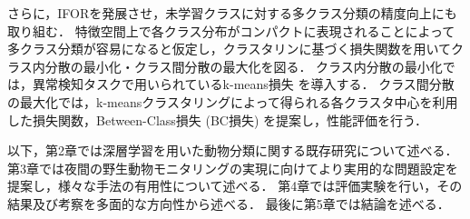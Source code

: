 \documentclass[a4paper,11pt,nomag]{jsreport}
\begin{document}
さらに，IFORを発展させ，未学習クラスに対する多クラス分類の精度向上にも取り組む．
特徴空間上で各クラス分布がコンパクトに表現されることによって多クラス分類が容易になると仮定し，クラスタリンに基づく損失関数を用いてクラス内分散の最小化・クラス間分散の最大化を図る．
クラス内分散の最小化では，異常検知タスクで用いられているk-means損失 \cite{k-means} を導入する．
クラス間分散の最大化では，k-meansクラスタリングによって得られる各クラスタ中心を利用した損失関数，Between-Class損失 (BC損失) を提案し，性能評価を行う．

以下，第2章では深層学習を用いた動物分類に関する既存研究について述べる．
第3章では夜間の野生動物モニタリングの実現に向けてより実用的な問題設定を提案し，様々な手法の有用性について述べる．
第4章では評価実験を行い，その結果及び考察を多面的な方向性から述べる．
最後に第5章では結論を述べる．



\end{document}
